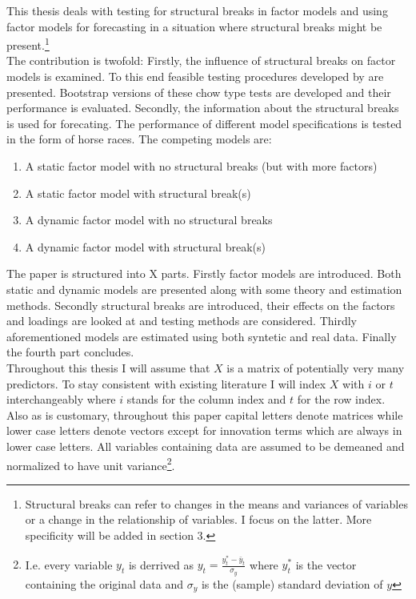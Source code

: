 \documentclass[11pt]{article}
\begin{document}
This thesis deals with testing for structural breaks in factor models and using factor models for forecasting in a situation where structural breaks might be present.\footnote{Structural breaks can refer to changes in the means and variances of variables or a change in the relationship of variables. I focus on the latter. More specificity will be added in section 3.} \\
The contribution is twofold: Firstly, the influence of structural breaks on factor models is examined. To this end feasible testing procedures developed by \citet{breitung2011testing} are presented. Bootstrap versions of these chow type tests are developed and their performance is evaluated. Secondly, the information about the structural breaks is used for forecating. The performance of different model specifications is tested in the form of horse races. The competing models are:
\begin{enumerate}
	\item A static factor model with no structural breaks (but with more factors)
	\item A static factor model with structural break(s)
	\item A dynamic factor model with no structural breaks
	\item A dynamic factor model with structural break(s)
\end{enumerate}

The paper is structured into X parts. Firstly factor models are introduced. Both static and dynamic models are presented along with some theory and estimation methods. Secondly structural breaks are introduced, their effects on the factors and loadings are looked at and testing methods are considered. Thirdly aforementioned models are estimated using both syntetic and real data. Finally the fourth part concludes. \\

Throughout this thesis I will assume that $X$ is a matrix of potentially very many predictors. To stay consistent with existing literature I will index $X$ with $i$ or $t$ interchangeably where $i$ stands for the column index and $t$ for the row index. Also as is customary, throughout this paper capital letters denote matrices while lower case letters denote vectors except for innovation terms which are always in lower case letters. All variables containing data are assumed to be demeaned and normalized to have unit variance\footnote{I.e. every variable $y_t$ is derrived as $y_t = \frac{y_t^* - \bar y_t}{\sigma_{y}}$ where $y_t^*$ is the vector containing the original data and $\sigma_{y}$ is the (sample) standard deviation of $y$}.
\end{document}
